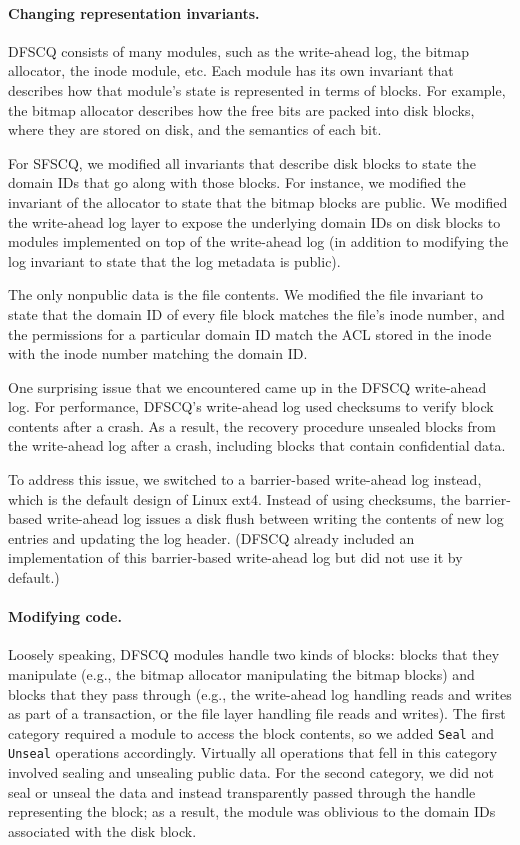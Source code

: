 \paragraph{Changing representation invariants.}

DFSCQ consists of many modules, such as the write-ahead log, the bitmap
allocator, the inode module, etc.  Each module has its own invariant
that describes how that module's state is represented in terms of blocks.
For example, the bitmap allocator describes how the free bits are packed
into disk blocks, where they are stored on disk, and the semantics of
each bit.

For SFSCQ, we modified all invariants that describe disk blocks to
state the domain IDs that go along with those blocks.  For instance,
we modified the invariant of the allocator to state that the bitmap
blocks are public.  We modified the write-ahead log layer to expose the
underlying domain IDs on disk blocks to modules implemented on top of
the write-ahead log (in addition to modifying the log invariant to state
that the log metadata is public).

The only nonpublic data is the file contents.  We modified the file
invariant to state that the domain ID of every file block matches the
file's inode number, and the permissions for a particular domain ID match
the ACL stored in the inode with the inode number matching the domain ID\@.

One surprising issue that we encountered came up in the DFSCQ write-ahead
log.  For performance, DFSCQ's write-ahead log used checksums to verify
block contents after a crash.  As a result, the recovery procedure
unsealed blocks from the write-ahead log after a crash, including blocks
that contain confidential data.

To address this issue, we switched to a barrier-based write-ahead log
instead, which is the default design of Linux ext4.  Instead of using
checksums, the barrier-based write-ahead log issues a disk flush between
writing the contents of new log entries and updating the log header.
(DFSCQ already included an implementation of this barrier-based
write-ahead log but did not use it by default.)


\paragraph{Modifying code.}

Loosely speaking, DFSCQ modules handle two kinds of blocks: blocks that
they manipulate (e.g., the bitmap allocator manipulating the bitmap
blocks) and blocks that they pass through (e.g., the write-ahead log
handling reads and writes as part of a transaction, or the file layer
handling file reads and writes).  The first category required a module
to access the block contents, so we added \texttt{Seal} and \texttt{Unseal}
operations accordingly.  Virtually all operations that fell in this
category involved sealing and unsealing public data.  For the second
category, we did not seal or unseal the data and instead transparently
passed through the handle representing the block; as a result, the module
was oblivious to the domain IDs associated with the disk block.

